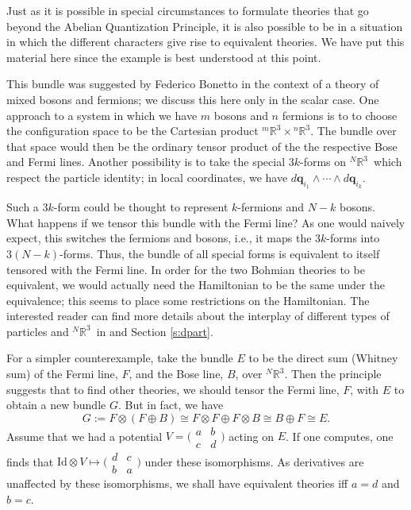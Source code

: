 \documentclass[11pt]{article}
\theoremstyle{remark}
\begin{document}
Just as it is possible in special circumstances to formulate theories
that go beyond the Abelian Quantization Principle, it is also possible to be in a situation in
which the different characters give rise to equivalent theories. We
have put this material here since the example is best understood at
this point. 


This bundle was suggested
by Federico Bonetto in the context of a theory of mixed bosons and
fermions; we discuss this here only in the scalar case. One approach to a
system in which we have $m$ bosons and  $n$ fermions is to 
to choose the configuration space to be the 
Cartesian product ${}^{m} \ensuremath{\mathbb{R}^{3}} \times {}^{n} \ensuremath{\mathbb{R}^{3}} $. The
 bundle over that space would then be the ordinary tensor product of the 
 the respective Bose and Fermi lines. Another possibility is to 
take the special $3k$-forms on \ensuremath{{}^N\ensuremath{\mathbb{R}^{3}}}\ which
respect the particle identity; in local coordinates, we have 
 $d\ensuremath{\boldsymbol{q}}_{i_1} \wedge  \cdots \wedge d\ensuremath{\boldsymbol{q}}_{i_k}$.


Such a $3k$-form could be thought to represent
$k$-fermions and $N-k$ bosons. What happens if we tensor this bundle
with the Fermi line? As one would naively expect, this switches the
fermions and bosons, i.e., it maps the $3k$-forms into
$3(N-k)$-forms. Thus, 
the bundle of all special forms is equivalent to itself tensored with
the Fermi line. In order for the two Bohmian theories to be
equivalent, we would actually need the Hamiltonian to be the same
under the equivalence;  this seems to place some restrictions on the
Hamiltonian. 
The interested reader can find more details about the interplay of
different types of particles and \ensuremath{{}^N\ensuremath{\mathbb{R}^{3}}}\ in
\cite{GTu03} and Section {\ref{s:dpart}}. 


For a simpler counterexample,  take 
the bundle $E$ to be the direct sum  (Whitney sum) of
the Fermi line, $F$,  and the Bose line, $B$,  over \ensuremath{{}^N\ensuremath{\mathbb{R}^{3}}}. Then the principle
 suggests that to find other 
theories, we should tensor the Fermi line, $F$,
with $E$ to obtain a new bundle $G$. 
But in fact, we have 
\[
G \ensuremath{:=} F \otimes (F \oplus B) \ensuremath{\cong} F \otimes F \oplus F \otimes B
\ensuremath{\cong} B \oplus F \ensuremath{\cong} E . 
\]
Assume that we had a potential $V= \bigl( \begin{smallmatrix} a &b \\
c&d \end{smallmatrix} \bigr)$ acting on $E$. If one computes, one
finds that $\ensuremath{\text{Id}} \otimes V \mapsto \bigl( \begin{smallmatrix} d &c \\
b&a \end{smallmatrix} \bigr)$ under these isomorphisms. 
As derivatives are unaffected by these
isomorphisms,  we shall have equivalent theories iff $a=d$ and $b
=c$. 
\end{document}
